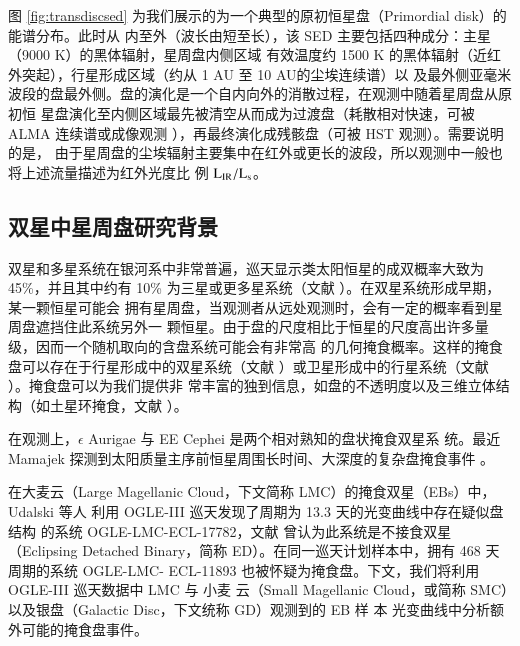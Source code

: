 图 \ref{fig:transdiscsed} 为我们展示的为一个典型的原初恒星盘（Primordial disk）的能谱分布。此时从
内至外（波长由短至长），该 SED 主要包括四种成分：主星（9000 K）的黑体辐射，星周盘内侧区域
有效温度约 1500 K 的黑体辐射（近红外突起），行星形成区域（约从 1 AU 至 10 AU的尘埃连续谱）以
及最外侧亚毫米波段的盘最外侧。盘的演化是一个自内向外的消散过程，在观测中随着星周盘从原初恒
星盘演化至内侧区域最先被清空从而成为过渡盘（耗散相对快速，可被 ALMA 连续谱或成像观测
\cite{WilliamsCieza2011}），再最终演化成残骸盘（可被 HST 观测\cite{Wyatt2008}）。需要说明的是，
由于星周盘的尘埃辐射主要集中在红外或更长的波段，所以观测中一般也将上述流量描述为红外光度比
例 $\mathrm{L}_\mathrm{IR}/\mathrm{L}_\mathrm{s}$。


\subsection{双星中星周盘研究背景} \label{sec:diskintro}

双星和多星系统在银河系中非常普遍，巡天显示类太阳恒星的成双概率大致为 45\%，并且其中约有 
10\% 为三星或更多星系统（文献 ）。在双星系统形成早期，某一颗恒星可能会
拥有星周盘\cite{Bate1995}，当观测者从远处观测时，会有一定的概率看到星周盘遮挡住此系统另外一
颗恒星。由于盘的尺度相比于恒星的尺度高出许多量级，因而一个随机取向的含盘系统可能会有非常高
的几何掩食概率\cite{Mamajek2012}。这样的掩食盘可以存在于行星形成中的双星系统（文献 
）或卫星形成中的行星系统（文献 ）。掩食盘可以为我们提供非
常丰富的独到信息，如盘的不透明度以及三维立体结构（如土星环掩食，文献 ）。

在观测上，$\epsilon$ Aurigae\cite{Guinan2002,Kloppenborg2010,Chadima2011} 与 EE Cephei 
\cite{Mikolajewski1999,Graczyk2003,Mikolajewski2005,Galan2012} 是两个相对熟知的盘状掩食双星系
统。最近 Mamajek 探测到太阳质量主序前恒星周围长时间、大深度的复杂盘掩食事件
\cite{Mamajek2012}。

在大麦云（Large Magellanic Cloud，下文简称 LMC）的掩食双星（EBs）中，Udalski 等人
\cite{Udalski2008,Graczyk2011}利用 OGLE-III 巡天发现了周期为 13.3 天的光变曲线中存在疑似盘结构
的系统 OGLE-LMC-ECL-17782，文献  曾认为此系统是不接食双星（Eclipsing 
Detached Binary，简称 ED）。在同一巡天计划样本中，拥有 468 天周期的系统 OGLE-LMC- 
ECL-11893 也被怀疑为掩食盘\cite{Dong2014}。下文，我们将利用 OGLE-III 巡天数据中 LMC 与 小麦
云（Small Magellanic Cloud，或简称 SMC）以及银盘（Galactic Disc，下文统称 GD）观测到的 EB 样
本\cite{Graczyk2011,Pawlak2013,Pietrukowicz2013} 光变曲线中分析额外可能的掩食盘事件。

